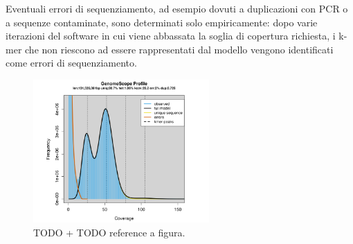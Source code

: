 \documentclass[crop=false, class=book]{standalone}
\begin{document}
	Eventuali errori di sequenziamento, ad esempio dovuti a duplicazioni con PCR o a sequenze contaminate, sono determinati solo empiricamente: dopo varie iterazioni del software in cui viene abbassata la soglia di copertura richiesta, i k-mer che non riescono ad essere rappresentati dal modello vengono identificati come errori di sequenziamento. 
	
	\begin{figure}
		\centering
		\includegraphics[width=0.6\textwidth]{./resources/images/gnmscp_genomescopeprofile.png}
		\caption{TODO + TODO reference a figura.}
		\label{fig:gnmscp_genomescopeprofile}
	\end{figure}

	
	
	
	
\end{document}
